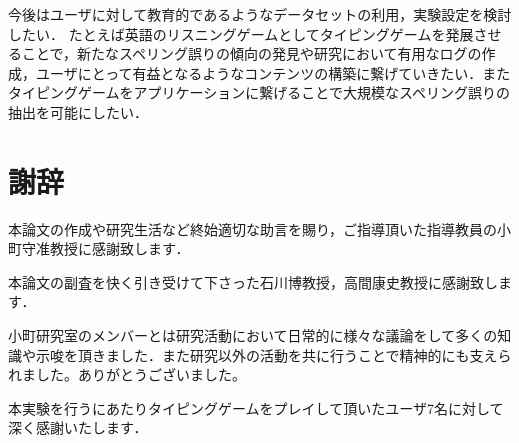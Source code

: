 \begin{comment}
タイピングゲームにおいて1文字入力するときの入力時間を記録しておくことでユーザがスペリング誤りを起こしていることを気付いて文字を打ち止めるときの文字と文字の間の境界をわかるようにするようにしたり，Babaらの研究\cite{babaACL2012}のようにバックスペースの入力をさせるようにしてスペリング誤りが修正されるものかそうでないかを明確にする必要があると考えられる．
\end{comment}

\begin{comment}
有用なログを抽出するために英単語以外にも英語の文章や日本語の単語，文章に対応するようなゲームの設計を行いたい．
\end{comment}

今後はユーザに対して教育的であるようなデータセットの利用，実験設定を検討したい．
たとえば英語のリスニングゲームとしてタイピングゲームを発展させることで，新たなスペリング誤りの傾向の発見や研究において有用なログの作成，ユーザにとって有益となるようなコンテンツの構築に繋げていきたい．またタイピングゲームをアプリケーションに繋げることで大規模なスペリング誤りの抽出を可能にしたい．

\newpage

\section*{\Large 謝辞}
本論文の作成や研究生活など終始適切な助言を賜り，ご指導頂いた指導教員の小町守准教授に感謝致します．

本論文の副査を快く引き受けて下さった石川博教授，高間康史教授に感謝致します．

小町研究室のメンバーとは研究活動において日常的に様々な議論をして多くの知識や示唆を頂きました．また研究以外の活動を共に行うことで精神的にも支えられました。ありがとうございました。

本実験を行うにあたりタイピングゲームをプレイして頂いたユーザ7名に対して深く感謝いたします．

